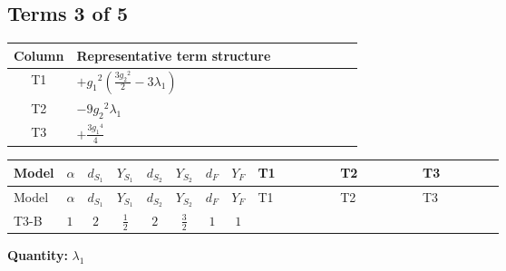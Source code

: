 \documentclass[8pt]{article}
\begin{document}
\begin{landscape}
\subsection*{Terms 3 of 5}
\begin{center}
\begin{tabular}{@{}c >{\raggedright\arraybackslash}p{0.82\linewidth}@{}}
\toprule
Column & Representative term structure \\
\midrule
T1 & \(\displaystyle +{g_1}^2 \left(\frac{3 {g_2}^2}{2}-3 {\lambda_1}\right)\) \\
\midrule
T2 & \(\displaystyle -9 {g_2}^2 {\lambda_1}\) \\
\midrule
T3 & \(\displaystyle +\frac{3 {g_1}^4}{4}\) \\
\midrule
\bottomrule
\end{tabular}
\end{center}
\smallskip
\tiny
\begin{longtable}{@{}llcccccc >{\raggedright\arraybackslash}p{0.21\linewidth} >{\raggedright\arraybackslash}p{0.21\linewidth} >{\raggedright\arraybackslash}p{0.21\linewidth}@{}}
\toprule
Model & $\alpha$ & $d_{S_1}$ & $Y_{S_1}$ & $d_{S_2}$ & $Y_{S_2}$ & $d_F$ & $Y_F$ & T1 & T2 & T3 \\
\midrule
\endfirsthead
\toprule
Model & $\alpha$ & $d_{S_1}$ & $Y_{S_1}$ & $d_{S_2}$ & $Y_{S_2}$ & $d_F$ & $Y_F$ & T1 & T2 & T3 \\
\midrule
\endhead
T3-B & $1$ & $2$ & $\frac{1}{2}$ & $2$ & $\frac{3}{2}$ & $1$ & $1$ & \scriptsize\adjustbox{max width=\linewidth}{$\begin{gathered} +{g_1}^2 \left(\frac{3 {g_2}^2}{2}-3 {\lambda_1}\right)\end{gathered}$} & \scriptsize\adjustbox{max width=\linewidth}{$\begin{gathered} -9 {g_2}^2 {\lambda_1}\end{gathered}$} & \scriptsize\adjustbox{max width=\linewidth}{$\begin{gathered} +\frac{3 {g_1}^4}{4}\end{gathered}$} \\
\midrule
\bottomrule
\end{longtable}
\clearpage
\noindent\textbf{Quantity: }$\lambda_1$\par\smallskip

\end{landscape}
\end{document}
